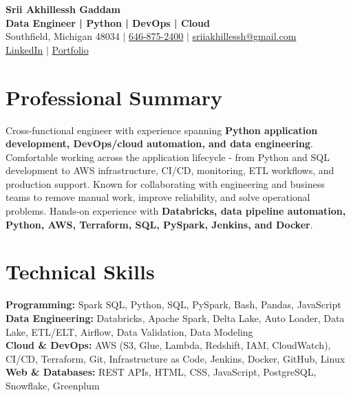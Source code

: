 \documentclass[letterpaper,10pt]{article}
\begin{document}
\fontsize{9.35pt}{10.45pt}\selectfont

\begin{center}
    {\LARGE \textbf{Srii Akhillessh Gaddam}} \\[-1pt]
    \textbf{Data Engineer | Python | DevOps | Cloud} \\[2pt]
    Southfield, Michigan 48034 $|$
    \href{tel:6468752400}{646-875-2400} $|$
    \href{mailto:sriiakhillessh@gmail.com}{sriiakhillessh@gmail.com} \\[1pt]
    \href{https://www.linkedin.com/in/srii-akhiilessh-gaddam-b48668191/}{LinkedIn} $|$
    \href{https://sriiakhillesshg.github.io/portfolio/}{Portfolio}
\end{center}
\vspace{-8pt}

\section{Professional Summary}
\small{Cross-functional engineer with experience spanning \textbf{Python application development, DevOps/cloud automation, and data engineering}. Comfortable working across the application lifecycle - from Python and SQL development to AWS infrastructure, CI/CD, monitoring, ETL workflows, and production support. Known for collaborating with engineering and business teams to remove manual work, improve reliability, and solve operational problems. Hands-on experience with \textbf{Databricks, data pipeline automation, Python, AWS, Terraform, SQL, PySpark, Jenkins, and Docker}.}

\section{Technical Skills}
\small{
\textbf{Programming:} Spark SQL, Python, SQL, PySpark, Bash, Pandas, JavaScript \\
\textbf{Data Engineering:} Databricks, Apache Spark, Delta Lake, Auto Loader, Data Lake, ETL/ELT, Airflow, Data Validation, Data Modeling \\
\textbf{Cloud \& DevOps:} AWS (S3, Glue, Lambda, Redshift, IAM, CloudWatch), CI/CD, Terraform, Git, Infrastructure as Code, Jenkins, Docker, GitHub, Linux \\
\textbf{Web \& Databases:} REST APIs, HTML, CSS, JavaScript, PostgreSQL, Snowflake, Greenplum
}
\end{document}

